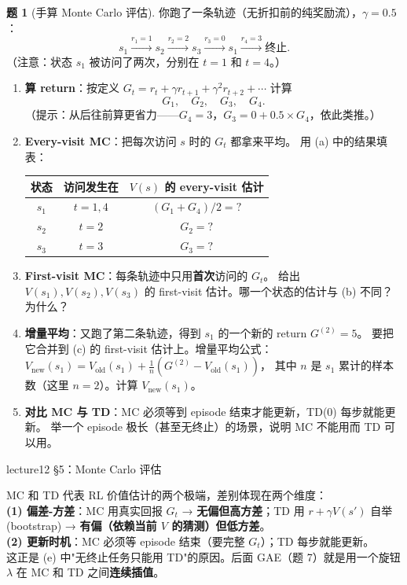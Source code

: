 \documentclass[11pt,a4paper]{article}
\theoremstyle{definition}
\newtheorem{problem}{题}
\begin{document}
\begin{problem}[手算 Monte Carlo 评估]
你跑了一条轨迹（无折扣前的纯奖励流），$\gamma = 0.5$：
\[
s_1 \xrightarrow{r_1 = 1} s_2 \xrightarrow{r_2 = 2} s_3 \xrightarrow{r_3 = 0} s_1 \xrightarrow{r_4 = 3} \text{终止}.
\]
（注意：状态 $s_1$ 被访问了两次，分别在 $t = 1$ 和 $t = 4$。）

\begin{enumerate}[label=(\alph*)]
    \item \textbf{算 return}：按定义 $G_t = r_t + \gamma r_{t+1} + \gamma^2 r_{t+2} + \cdots$ 计算
    \[
    G_1, \quad G_2, \quad G_3, \quad G_4.
    \]
    （提示：从后往前算更省力——$G_4 = 3$，$G_3 = 0 + 0.5 \times G_4$，依此类推。）
    
    \item \textbf{Every-visit MC}：把每次访问 $s$ 时的 $G_t$ 都拿来平均。
    用 (a) 中的结果填表：
    \begin{center}
    \begin{tabular}{c|c|c}
    \toprule
    状态 & 访问发生在 & $V(s)$ 的 every-visit 估计 \\
    \midrule
    $s_1$ & $t = 1, 4$ & $(G_1 + G_4)/2 = ?$ \\
    $s_2$ & $t = 2$ & $G_2 = ?$ \\
    $s_3$ & $t = 3$ & $G_3 = ?$ \\
    \bottomrule
    \end{tabular}
    \end{center}
    
    \item \textbf{First-visit MC}：每条轨迹中只用\textbf{首次}访问的 $G_t$。
    给出 $V(s_1), V(s_2), V(s_3)$ 的 first-visit 估计。哪一个状态的估计与 (b) 不同？为什么？
    
    \item \textbf{增量平均}：又跑了第二条轨迹，得到 $s_1$ 的一个新的 return $G^{(2)} = 5$。
    要把它合并到 (c) 的 first-visit 估计上。增量平均公式：
    $V_{\text{new}}(s_1) = V_{\text{old}}(s_1) + \frac{1}{n}\!\left(G^{(2)} - V_{\text{old}}(s_1)\right)$，
    其中 $n$ 是 $s_1$ 累计的样本数（这里 $n = 2$）。计算 $V_{\text{new}}(s_1)$。
    
    \item \textbf{对比 MC 与 TD}：MC 必须等到 episode 结束才能更新，TD(0) 每步就能更新。
    举一个 episode 极长（甚至无终止）的场景，说明 MC 不能用而 TD 可以用。
\end{enumerate}
\begin{topicbox}
lecture12 §5：Monte Carlo 评估
\end{topicbox}
\begin{takeaway}
MC 和 TD 代表 RL 价值估计的两个极端，差别体现在两个维度：\\
\textbf{(1) 偏差-方差}：MC 用真实回报 $G_t$ → \textbf{无偏但高方差}；TD 用 $r + \gamma V(s')$ 自举(bootstrap) → \textbf{有偏（依赖当前 $V$ 的猜测）但低方差}。\\
\textbf{(2) 更新时机}：MC 必须等 episode 结束（要完整 $G_t$）；TD 每步就能更新。\\
这正是 (e) 中"无终止任务只能用 TD"的原因。后面 GAE（题 7）就是用一个旋钮 $\lambda$ 在 MC 和 TD 之间\textbf{连续插值}。
\end{takeaway}
\end{problem}
\end{document}
